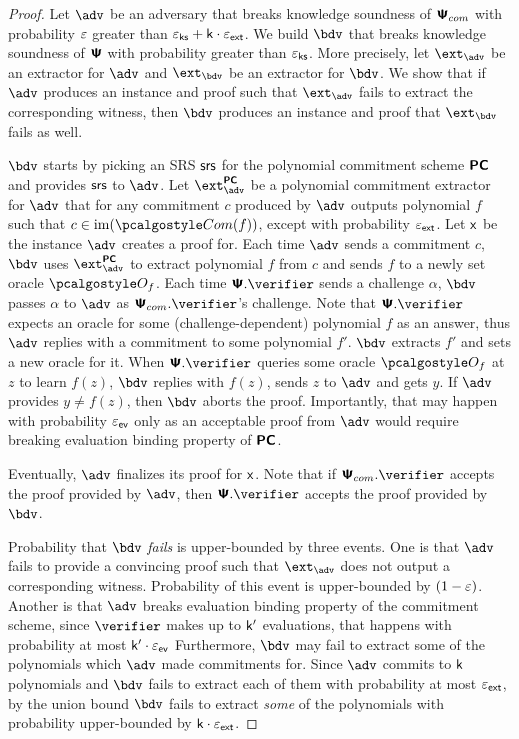 \documentclass[runningheads,11pt]{llncs}
\begin{document}
\begin{proof}
  Let $\adv$ be an adversary that breaks knowledge soundness of $\bm{\mathsf{\Psi}}_{com}$ with
  probability $\varepsilon$ greater than $\varepsilon_{\mathsf{ks}} + \mathsf{k} \cdot \varepsilon_{\mathsf{ext}}$.  We build
  $\bdv$ that breaks knowledge soundness of $\bm{\mathsf{\Psi}}$ with probability greater than
  $\varepsilon_{\mathsf{ks}}$. More precisely, let $\ext_\adv$ be an extractor for $\adv$ and
  $\ext_\bdv$ be an extractor for $\bdv$. We show that if $\adv$ produces an
  instance and proof such that $\ext_\adv$ fails to extract the corresponding
  witness, then $\bdv$ produces an instance and proof that $\ext_\bdv$ fails as well.

  $\bdv$ starts by picking an SRS $\mathsf{srs}$ for the polynomial commitment scheme
  $\bm{\mathsf{PC}}$ and provides $\mathsf{srs}$ to $\adv$. Let $\ext^{\PCOM}_\adv$ be a polynomial
  commitment extractor for $\adv$ that for any commitment $c$ produced by $\adv$
  outputs polynomial $f$ such that $c \in \image(\com(f))$, except with
  probability $\varepsilon_{\mathsf{ext}}$.  Let $\mathsf{x}$ be the instance $\adv$ creates a proof
  for. Each time $\adv$ sends a commitment $c$, $\bdv$ uses $\ext^{\PCOM}_\adv$
  to extract polynomial $f$ from $c$ and sends $f$ to a newly set oracle
  $\oracleo_f$.    Each time
  $\PS.\verifier$ sends a challenge $\alpha$, $\bdv$ passes $\alpha$ to $\adv$
  as $\PSc.\verifier$'s challenge. Note that $\PS.\verifier$ expects an oracle
  for some (challenge-dependent) polynomial $f$ as an answer, thus $\adv$
  replies with a commitment to some polynomial $f'$. $\bdv$ extracts $f'$ and
  sets a new oracle for it.  When $\PS.\verifier$ queries some oracle
  $\oracleo_f$ at $z$ to learn $f(z)$, $\bdv$ replies with $f(z)$, sends $z$
  to $\adv$ and gets $y$. If $\adv$ provides $y \neq f(z)$, then $\bdv$ aborts
  the proof. Importantly, that may happen with probability $\varepsilon_{\mathsf{ev}}$ only as an
  acceptable proof from $\adv$ would require breaking evaluation binding
  property of $\bm{\mathsf{PC}}$. 
  
  Eventually, $\adv$ finalizes its proof for $\mathsf{x}$. Note that
  if $\PSc.\verifier$ accepts the proof provided by $\adv$, then $\PS.\verifier$
  accepts the proof provided by $\bdv$.

  Probability that $\bdv$ \emph{fails} is upper-bounded by three events. One is
  that $\adv$ fails to provide a convincing proof such that $\ext_\adv$ does not
  output a corresponding witness. Probability of this event is upper-bounded by
  $(1 - \varepsilon)$. Another is that $\adv$ breaks evaluation binding property of the
  commitment scheme, since $\verifier$ makes up to $\mathsf{k'}$ evaluations, that
  happens with probability at most $\mathsf{k'} \cdot \varepsilon_{\mathsf{ev}}$ Furthermore, $\bdv$
  may fail to extract some of the polynomials which $\adv$ made commitments
  for. Since $\adv$ commits to $\mathsf{k}$ polynomials and $\bdv$ fails to extract
  each of them with probability at most $\varepsilon_{\mathsf{ext}}$, by the union bound $\bdv$
  fails to extract \emph{some} of the polynomials with probability upper-bounded
  by $\mathsf{k} \cdot \varepsilon_{\mathsf{ext}}$.


\end{proof}
\end{document}
